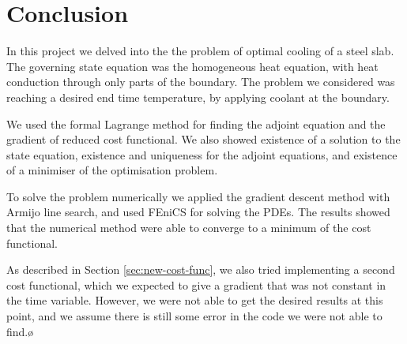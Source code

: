 \section{Conclusion}

In this project we delved into the the problem of optimal cooling of a steel slab. The governing state equation was the homogeneous heat equation, with heat conduction through only parts of the boundary. The problem we considered was reaching a desired end time temperature, by applying coolant at the boundary. 

We used the formal Lagrange method for finding the adjoint equation and the gradient of reduced cost functional. We also showed existence of a solution to the state equation,  existence and uniqueness for the adjoint equations, and existence of a minimiser of the optimisation problem.

To solve the problem numerically we applied the gradient descent method with Armijo line search, and used FEniCS for solving the PDEs. The results showed that the numerical method were able to converge to a minimum of the cost functional. 

As described in Section \ref{sec:new-cost-func}, we also tried implementing a second cost functional, which we expected to give a gradient that was not constant in the time variable. However, we were not able to get the desired results at this point, and we assume there is still some error in the code we were not able to find.ø

